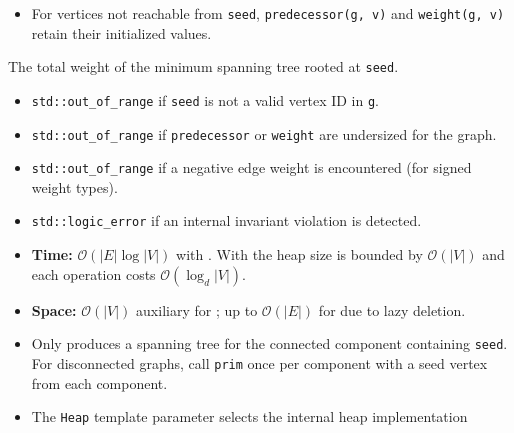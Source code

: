\begin{itemdescr}
\begin{itemize}
                        in the tree.  \lstinline{predecessor(g, seed) == seed}.
                        When \lstinline{compare} is \lstinline{<}, \lstinline{predecessor} represents a minimum weight spanning tree.
                  \item
                        For vertices not reachable from \lstinline{seed}, \lstinline{predecessor(g, v)} and \lstinline{weight(g, v)}
                        retain their initialized values.
            \end{itemize}
      \pnum\returns The total weight of the minimum spanning tree rooted at \lstinline{seed}.
      \pnum\throws
            \begin{itemize}
                  \item \lstinline{std::out_of_range} if \lstinline{seed} is not a valid vertex ID in \lstinline{g}.
                  \item \lstinline{std::out_of_range} if \lstinline{predecessor} or \lstinline{weight} are undersized for the graph.
                  \item \lstinline{std::out_of_range} if a negative edge weight is encountered (for signed weight types).
                  \item \lstinline{std::logic_error} if an internal invariant violation is detected.
            \end{itemize}
      \pnum\complexity
            \begin{itemize}
                  \item \textbf{Time:} $\mathcal{O}(|E|\log{|V|})$ with .
                        With  the heap size is bounded by $\mathcal{O}(|V|)$
                        and each operation costs $\mathcal{O}(\log_{d}{|V|})$.
                  \item \textbf{Space:} $\mathcal{O}(|V|)$ auxiliary for ;
                        up to $\mathcal{O}(|E|)$ for  due to lazy deletion.
            \end{itemize}
      \pnum\remarks
            \begin{itemize}
                  \item Only produces a spanning tree for the connected component containing \lstinline{seed}.
                        For disconnected graphs, call \lstinline{prim} once per component with a seed vertex from each component.
                  \item The \lstinline{Heap} template parameter selects the internal heap implementation

\end{itemize}
\end{itemdescr}
